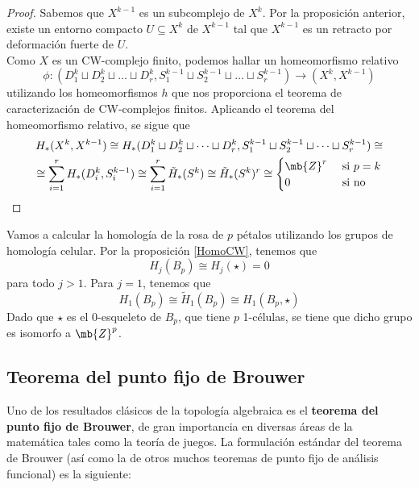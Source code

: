 \begin{cor}\end{cor}

\begin{proof}
Sabemos que $X^{k-1}$ es un subcomplejo de $X^k$. Por la proposición anterior, existe un entorno compacto $U \subseteq X^k$ de $X^{k-1}$ tal que $X^{k-1}$ es un retracto por deformación fuerte de $U$.
\\

Como $X$ es un CW-complejo finito, podemos hallar un homeomorfismo relativo $$\phi: (D_1^k\sqcup D_2^k\sqcup \dots \sqcup D^k_r, S_1^{k-1}\sqcup S_2^{k-1}\sqcup \dots \sqcup S^{k-1}_r) \longrightarrow (X^k,X^{k-1})$$ utilizando los homeomorfismos $h$ que nos proporciona el teorema de caracterización de CW-complejos finitos. Aplicando el teorema del homeomorfismo relativo, se sigue que 
\begin{multline*}
H_*(X^k,X^{k-1}) \cong H_*(D_1^k\sqcup D_2^k\sqcup \dots \sqcup D^k_r, S_1^{k-1}\sqcup S_2^{k-1}\sqcup \dots \sqcup S^{k-1}_r) \cong \\ \cong \sum^r_{i=1} H_*(D_i^k, S_i^{k-1}) \cong \sum^r_{i=1} \tilde{H}_*(S^k) \cong \tilde{H}_*(S^k)^r \cong \begin{cases}\mb{Z}^r&\mbox{ si }p=k\\0&\mbox{ si no}\end{cases}
\end{multline*}
\end{proof}

\begin{ejem}
Vamos a calcular la homología de la rosa de $p$ pétalos utilizando los grupos de homología celular. Por la proposición \ref{HomoCW}, tenemos que $$H_j(B_p)\cong H_j(\star)=0$$ para todo $j > 1$. Para $j=1$, tenemos que $$H_1(B_p)\cong \tilde{H}_1(B_p)\cong H_1(B_p,\star)$$ Dado que $\star$ es el 0-esqueleto de $B_p$, que tiene $p$ 1-células, se tiene que dicho grupo es isomorfo a $\mb{Z}^p$.
\end{ejem}

\subsection{Teorema del punto fijo de Brouwer}
Uno de los resultados clásicos de la topología algebraica es el \textbf{teorema del punto fijo de Brouwer}, de gran importancia en diversas áreas de la matemática tales como la teoría de juegos. La formulación estándar del teorema de Brouwer (así como la de otros muchos teoremas de punto fijo de análisis funcional) es la siguiente:

